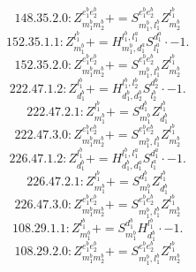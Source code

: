 \documentclass[letterpaper,10pt,fleqn,leqno,onecolumn]{article}
\begin{document}
\begin{equation} \;\;\;\;\;\;  148.35.2.0: Z^{e_{1}^{b}e_{2}^{b}}_{m_{1}^{b}m_{2}^{b}}+=S^{e_{1}^{b}e_{2}^{b}}_{m_{1}^{b},l_{1}^{b}}Z^{l_{1}^{b}}_{m_{2}^{b}} \end{equation}
\begin{equation} \;\;\;\;\;\;  152.35.1.1: Z^{l_{1}^{b}}_{m_{1}^{b}}+=H^{l_{1}^{b},l_{1}^{a}}_{m_{1}^{b},d_{1}^{a}}S^{d_{1}^{a}}_{l_{1}^{a}}\cdot -1. \end{equation}
\begin{equation} \;\;\;\;\;\;  152.35.2.0: Z^{e_{1}^{b}e_{2}^{b}}_{m_{1}^{b}m_{2}^{b}}+=S^{e_{1}^{b}e_{2}^{b}}_{m_{1}^{b},l_{1}^{b}}Z^{l_{1}^{b}}_{m_{2}^{b}} \end{equation}
\begin{equation} \;\;\;\;\;\;  222.47.1.2: Z^{l_{1}^{b}}_{d_{1}^{b}}+=H^{l_{1}^{b},l_{2}^{b}}_{d_{1}^{b},d_{2}^{b}}S^{d_{2}^{b}}_{l_{2}^{b}}\cdot -1. \end{equation}
\begin{equation} \;\;\;\;\;\;  222.47.2.1: Z^{l_{1}^{b}}_{m_{1}^{b}}+=S^{d_{1}^{b}}_{m_{1}^{b}}Z^{l_{1}^{b}}_{d_{1}^{b}} \end{equation}
\begin{equation} \;\;\;\;\;\;  222.47.3.0: Z^{e_{1}^{b}e_{2}^{b}}_{m_{1}^{b}m_{2}^{b}}+=S^{e_{1}^{b}e_{2}^{b}}_{m_{1}^{b},l_{1}^{b}}Z^{l_{1}^{b}}_{m_{2}^{b}} \end{equation}
\begin{equation} \;\;\;\;\;\;  226.47.1.2: Z^{l_{1}^{b}}_{d_{1}^{b}}+=H^{l_{1}^{b},l_{1}^{a}}_{d_{1}^{b},d_{1}^{a}}S^{d_{1}^{a}}_{l_{1}^{a}}\cdot -1. \end{equation}
\begin{equation} \;\;\;\;\;\;  226.47.2.1: Z^{l_{1}^{b}}_{m_{1}^{b}}+=S^{d_{1}^{b}}_{m_{1}^{b}}Z^{l_{1}^{b}}_{d_{1}^{b}} \end{equation}
\begin{equation} \;\;\;\;\;\;  226.47.3.0: Z^{e_{1}^{b}e_{2}^{b}}_{m_{1}^{b}m_{2}^{b}}+=S^{e_{1}^{b}e_{2}^{b}}_{m_{1}^{b},l_{1}^{b}}Z^{l_{1}^{b}}_{m_{2}^{b}} \end{equation}
\begin{equation} \;\;\;\;\;\;  108.29.1.1: Z^{l_{1}^{b}}_{m_{1}^{b}}+=S^{d_{1}^{b}}_{m_{1}^{b}}H^{l_{1}^{b}}_{d_{1}^{b}}\cdot -1. \end{equation}
\begin{equation} \;\;\;\;\;\;  108.29.2.0: Z^{e_{1}^{b}e_{2}^{b}}_{m_{1}^{b}m_{2}^{b}}+=S^{e_{1}^{b}e_{2}^{b}}_{m_{1}^{b},l_{1}^{b}}Z^{l_{1}^{b}}_{m_{2}^{b}} \end{equation}
\end{document}
